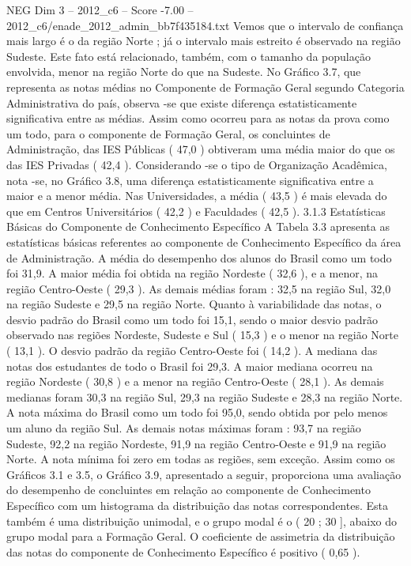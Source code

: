 \begin{textsample}{NEG Dim 3 – 2012\_c6 – Score -7.00 – 2012\_c6/enade\_2012\_admin\_bb7f435184.txt}
Vemos que o intervalo de confiança mais largo é o da região Norte ; já o intervalo mais estreito é observado na região Sudeste.
Este fato está relacionado, também, com o tamanho da população envolvida, menor na região Norte do que na Sudeste.
No Gráfico 3.7, que representa as notas médias no Componente de Formação Geral segundo Categoria Administrativa do país, observa -se que existe diferença estatisticamente significativa entre as médias.
Assim como ocorreu para as notas da prova como um todo, para o componente de Formação Geral, os concluintes de Administração, das IES Públicas ( 47,0 ) obtiveram uma média maior do que os das IES Privadas ( 42,4 ).
Considerando -se o tipo de Organização Acadêmica, nota -se, no Gráfico 3.8, uma diferença estatisticamente significativa entre a maior e a menor média.
Nas Universidades, a média ( 43,5 ) é mais elevada do que em Centros Universitários ( 42,2 ) e Faculdades ( 42,5 ). 3.1.3 Estatísticas Básicas do Componente de Conhecimento Específico A Tabela 3.3 apresenta as estatísticas básicas referentes ao componente de Conhecimento Específico da área de Administração.
A média do desempenho dos alunos do Brasil como um todo foi 31,9.
A maior média foi obtida na região Nordeste ( 32,6 ), e a menor, na região Centro-Oeste ( 29,3 ).
As demais médias foram : 32,5 na região Sul, 32,0 na região Sudeste e 29,5 na região Norte.
Quanto à variabilidade das notas, o desvio padrão do Brasil como um todo foi 15,1, sendo o maior desvio padrão observado nas regiões Nordeste, Sudeste e Sul ( 15,3 ) e o menor na região Norte ( 13,1 ).
O desvio padrão da região Centro-Oeste foi ( 14,2 ).
A mediana das notas dos estudantes de todo o Brasil foi 29,3.
A maior mediana ocorreu na região Nordeste ( 30,8 ) e a menor na região Centro-Oeste ( 28,1 ).
As demais medianas foram 30,3 na região Sul, 29,3 na região Sudeste e 28,3 na região Norte.
A nota máxima do Brasil como um todo foi 95,0, sendo obtida por pelo menos um aluno da região Sul.
As demais notas máximas foram : 93,7 na região Sudeste, 92,2 na região Nordeste, 91,9 na região Centro-Oeste e 91,9 na região Norte.
A nota mínima foi zero em todas as regiões, sem exceção.
Assim como os Gráficos 3.1 e 3.5, o Gráfico 3.9, apresentado a seguir, proporciona uma avaliação do desempenho de concluintes em relação ao componente de Conhecimento Específico com um histograma da distribuição das notas correspondentes.
Esta também é uma distribuição unimodal, e o grupo modal é o ( 20 ; 30 ], abaixo do grupo modal para a Formação Geral.
O coeficiente de assimetria da distribuição das notas do componente de Conhecimento Específico é positivo ( 0,65 ).

\end{textsample}
